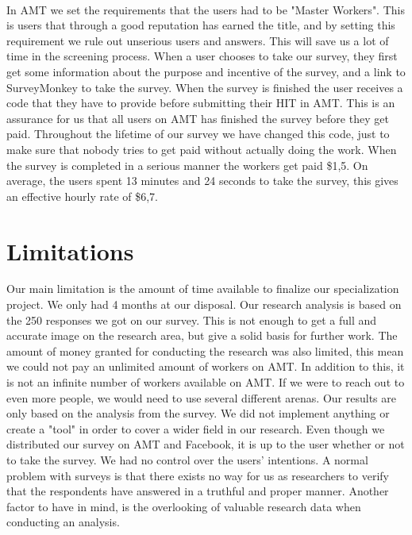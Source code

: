 \paragraph{}
In AMT we set the requirements that the users had to be "Master Workers". This is users that through a good reputation has earned the title, and by setting this requirement we rule out unserious users and answers. This will save us a lot of time in the screening process. When a user chooses to take our survey, they first get some information about the purpose and incentive of the survey, and a link to SurveyMonkey to take the survey. When the survey is finished the user receives a code that they have to provide before submitting their HIT in AMT. This is an assurance for us that all users on AMT has finished the survey before they get paid. Throughout the lifetime of our survey we have changed this code, just to make sure that nobody tries to get paid without actually doing the work. When the survey is completed in a serious manner the workers get paid \$1,5. On average, the users spent 13 minutes and 24 seconds to take the survey, this gives an effective hourly rate of \$6,7. 

\section{Limitations} 
Our main limitation is the amount of time available to finalize our specialization project. We only had 4 months at our disposal. Our research analysis is based on the 250 responses we got on our survey. This is not enough to get a full and accurate image on the research area, but give a solid basis for further work. The amount of money granted for conducting the research was also limited, this mean we could not pay an unlimited amount of workers on AMT. In addition to this, it is not an infinite number of workers available on AMT. If we were to reach out to even more people, we would need to use several different arenas. Our results are only based on the analysis from the survey. We did not implement anything or create a "tool" in order to cover a wider field in our research. Even though we distributed our survey on AMT and Facebook, it is up to the user whether or not to take the survey. We had no control over the users' intentions. A normal problem with surveys is that there exists no way for us as researchers to verify that the respondents have answered in a truthful and proper manner. Another factor to have in mind, is the overlooking of valuable research data when conducting an analysis. 


